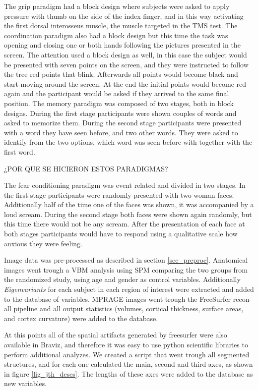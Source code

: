 The grip paradigm had a block design where subjects were asked to apply pressure with thumb on the side of the index finger, and in this way activating the first dorsal interosseus muscle, the muscle targeted in the TMS test. The coordination paradigm also had a block design but this time the task was opening and closing one or both hands following the pictures presented in the screen. The attention used a block design as well, in this case the subject would be presented with seven points on the screen, and they were instructed to follow the tree red points that blink. Afterwards all points would become black and start moving around the screen. At the end the initial points would become red again and the participant would be asked if they arrived to the same final position. 
The memory paradigm was composed of two stages, both in block designs. During the first stage participants were shown couples of words and asked to memorize them. During the second stage participants were presented with a word they have seen before, and two other words. They were asked to identify from the two options, which word was seen before with together with the first word.

¿POR QUE SE HICIERON ESTOS PARADIGMAS?

The fear conditioning paradigm \autocite{FRANCOISES} was event related and divided in two stages. In the first stage participants were randomly presented with two woman faces. Additionally half of the time one of the faces was shown, it was accompanied by a loud scream.  During the second stage  both faces were shown again randomly, but this time there would not be any scream. After the presentation of each face at both stages participants would have to respond using a qualitative scale how anxious they were feeling.
\smallskip

Image data was pre-processed as described in section \ref{sec_preproc}. Anatomical images went trough a VBM analysis using SPM comparing the two groups from the randomized study, using age and gender as control variables. Additionally \emph{Eigenvariants} for each subject in each region of interest were extracted and added to the database of variables. MPRAGE images went trough the FreeSurfer recon-all pipeline and all output statistics (volumes, cortical thickness, surface areas, and cortex curvature) were added to the database. 

At this points all of the spatial artifacts generated by freesurfer were also available in Braviz, and therefore it was easy to use python scientific libraries to perform additional analyzes. We created a script that went trough all segmented structures, and for each one calculated the main, second and third axes, as shown in figure \ref{fig_jth_descs}. The lengths of these axes were added to the database as new variables.

